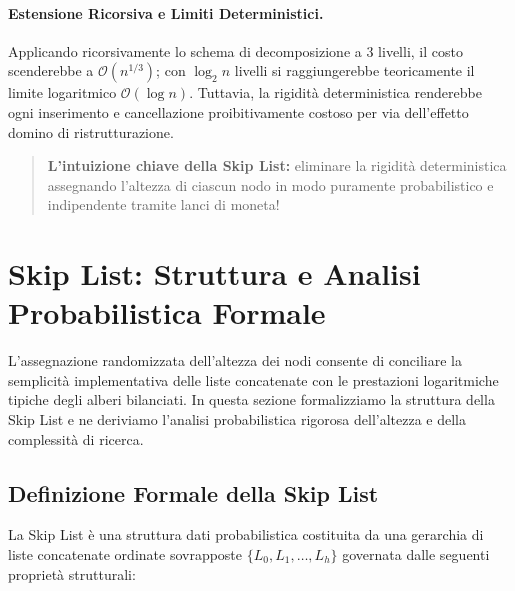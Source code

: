 \paragraph{Estensione Ricorsiva e Limiti Deterministici.}
Applicando ricorsivamente lo schema di decomposizione a $3$ livelli, il costo scenderebbe a $\mathcal{O}(n^{1/3})$; con $\log_2 n$ livelli si raggiungerebbe teoricamente il limite logaritmico $\mathcal{O}(\log n)$. Tuttavia, la rigidità deterministica renderebbe ogni inserimento e cancellazione proibitivamente costoso per via dell'effetto domino di ristrutturazione.

\begin{quote}
  \textbf{L'intuizione chiave della Skip List:} eliminare la rigidità deterministica assegnando l'altezza di ciascun nodo in modo puramente probabilistico e indipendente tramite lanci di moneta!
\end{quote}

\FloatBarrier
\section{Skip List: Struttura e Analisi Probabilistica Formale}
\label{sec:skip-list-probabilistic-analysis}

L'assegnazione randomizzata dell'altezza dei nodi consente di conciliare la semplicit\`a implementativa delle liste concatenate con le prestazioni logaritmiche tipiche degli alberi bilanciati. In questa sezione formalizziamo la struttura della Skip List e ne deriviamo l'analisi probabilistica rigorosa dell'altezza e della complessit\`a di ricerca.

\FloatBarrier
\subsection{Definizione Formale della Skip List}
La Skip List è una struttura dati probabilistica costituita da una gerarchia di liste concatenate ordinate sovrapposte $\{L_0, L_1, \dots, L_h\}$ governata dalle seguenti proprietà strutturali:

